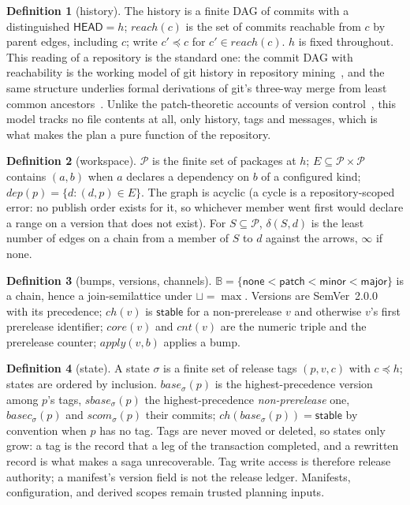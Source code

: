 \documentclass[10pt,conference]{IEEEtran}
\theoremstyle{definition}
\newtheorem{definition}{Definition}
\begin{document}
\begin{definition}[history]
The history is a finite DAG of commits with a distinguished
$\mathsf{HEAD} = h$; $\mathit{reach}(c)$ is the set of commits reachable
from $c$ by parent edges, including $c$; write $c' \preceq c$ for
$c' \in \mathit{reach}(c)$. $h$ is fixed throughout. This reading of a
repository is the standard one: the commit DAG with reachability is the
working model of git history in repository mining~\cite{birdgit}, and
the same structure underlies formal derivations of git's three-way
merge from least common ancestors~\cite{mrdt}. Unlike the
patch-theoretic accounts of version
control~\cite{swierstraloh,hpt,mimram}, this model tracks no file
contents at all, only history, tags and messages, which is what
makes the plan a pure function of the repository.
\end{definition}

\begin{definition}[workspace]
$\mathcal{P}$ is the finite set of packages at $h$; $E \subseteq
\mathcal{P} \times \mathcal{P}$ contains $(a,b)$ when $a$ declares a
dependency on $b$ of a configured kind; $\mathit{dep}(p) = \{d : (d,p)
\in E\}$. The graph is acyclic (a cycle is a repository-scoped error: no
publish order exists for it, so whichever member went first would
declare a range on a version that does not exist). For $S \subseteq
\mathcal{P}$, $\delta(S,d)$ is the least number of edges on a chain from
a member of $S$ to $d$ against the arrows, $\infty$ if none.
\end{definition}

\begin{definition}[bumps, versions, channels]
$\mathbb{B} = \{\mathsf{none} < \mathsf{patch} < \mathsf{minor} <
\mathsf{major}\}$ is a chain, hence a join-semilattice under
$\sqcup = \max$. Versions are SemVer~2.0.0~\cite{semver} with its
precedence; $\mathit{ch}(v)$ is $\mathsf{stable}$ for a non-prerelease
$v$ and otherwise $v$'s first prerelease identifier; $\mathit{core}(v)$
and $\mathit{cnt}(v)$ are the numeric triple and the prerelease counter;
$\mathit{apply}(v,b)$ applies a bump.
\end{definition}

\begin{definition}[state]
\label{def:state}
A state $\sigma$ is a finite set of release tags $(p, v, c)$ with
$c \preceq h$; states are ordered by inclusion. $\mathit{base}_\sigma(p)$
is the highest-precedence version among $p$'s tags,
$\mathit{sbase}_\sigma(p)$ the highest-precedence \emph{non-prerelease}
one, $\mathit{basec}_\sigma(p)$ and $\mathit{scom}_\sigma(p)$ their
commits; $\mathit{ch}(\mathit{base}_\sigma(p)) = \mathsf{stable}$ by
convention when $p$ has no tag. Tags are never moved or deleted, so
states only grow: a tag is the record that a leg of the transaction
completed, and a rewritten record is what makes a saga unrecoverable.
Tag write access is therefore release authority; a manifest's version field
is not the release ledger. Manifests, configuration, and derived scopes remain
trusted planning inputs.
\end{definition}
\end{document}
